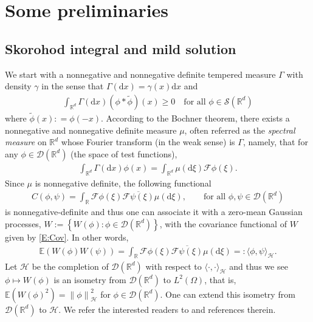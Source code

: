 \documentclass[a4paper,11pt]{article}
\numberwithin{equation}{section}
\numberwithin{equation}{section}
\theoremstyle{plain}
\theoremstyle{definition}
\newcommand{\E}{\mathbb{E}}
\newcommand{\ud}{\ensuremath{\mathrm{d} }}
\newcommand{\Norm}[1]{\left\|  #1   \right\|}
\newcommand{\R}{\mathbb{R}}
\begin{document}
\section{Some preliminaries} \label{S:Pre}

\subsection{Skorohod integral and mild solution} \label{SS:Malliavin}

We start with a nonnegative and nonnegative definite tempered measure $\Gamma$ with density $\gamma$
in the sense that $\Gamma(\ud x) = \gamma(x) \ud x$ and
\begin{align*}
  \int_{\R^d} \Gamma(\ud x) (\phi * \widetilde{\phi})(x) \ge 0 \quad \text{for all $\phi \in \mathscr{S}(\R^d)$}
\end{align*}
where $\widetilde{\phi}(x): = \phi(-x)$.
According to the Bochner theorem, there exists a nonnegative and nonnegative definite measure $\mu$,
often referred as the {\it spectral measure} on $\R^d$ whose Fourier transform (in the weak sense)
is $\Gamma$, namely, that for any $\phi \in \mathcal{D}(\R^d)$ (the space of test functions),
\begin{align*}
  \int_{\R^d}\Gamma(\ud x) \phi(x) = \int_{\R^d} \mu(\ud \xi) \mathcal{F}\phi (\xi).
\end{align*}
Since $\mu$ is nonnegative definite, the following functional
\begin{align} \label{E:Cov}
  C(\phi,\psi) = \int_{\R} \mathcal{F}\phi(\xi) \overline{ \mathcal{F}\psi(\xi) } \mu(\ud \xi),
  \qquad \text{for all $\phi,\psi\in\mathcal{D}(\R^d)$}
\end{align}
is nonnegative-definite and thus one can associate it with a zero-mean Gaussian processes, $W:=
\left\{ W(\phi) : \phi \in \mathcal{D}(\R^d) \right\}$, with the covariance functional of $W$ given
by \eqref{E:Cov}. In other words,
\begin{align*}
  \mathbb{E}\left(W(\phi)W(\psi)\right)
  = \int_{\R} \mathcal{F}\phi(\xi) \overline{ \mathcal{F}\psi(\xi) } \mu(\ud \xi)
  =: \langle \phi, \psi \rangle_{\mathcal{H}}.
\end{align*}
Let $\mathcal{H}$ be the completion of $\mathcal{D}(\R^d)$ with respect to $\langle \cdot, \cdot
\rangle_{\mathcal{H}}$ and thus we see $\phi \mapsto W(\phi)$ is an isometry from
$\mathcal{D}(\R^d)$ to $L^2(\Omega)$, that is, $\E\left(W(\phi)^2\right) =
\Norm{\phi}_{\mathcal{H}}^2$ for $\phi\in \mathcal{D}(\R^d)$. One can extend this isometry from
$\mathcal{D}(\R^d)$ to $\mathcal{H}$. We refer the interested readers to \cite{Minicourse09} and
references therein.  \bigskip
\end{document}

